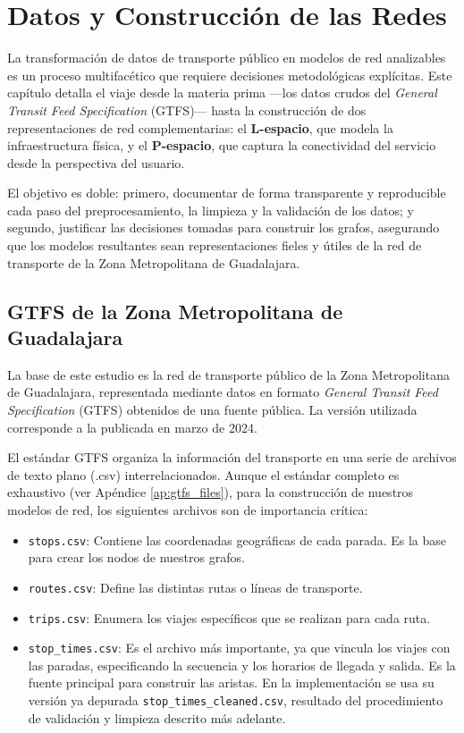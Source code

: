 \chapter{Datos y Construcción de las Redes}

    La transformación de datos de transporte público en modelos de red analizables es un proceso multifacético que requiere decisiones metodológicas explícitas. Este capítulo detalla el viaje desde la materia prima —los datos crudos del \textit{General Transit Feed Specification} (GTFS)— hasta la construcción de dos representaciones de red complementarias: el \textbf{L-espacio}, que modela la infraestructura física, y el \textbf{P-espacio}, que captura la conectividad del servicio desde la perspectiva del usuario.
    
    El objetivo es doble: primero, documentar de forma transparente y reproducible cada paso del preprocesamiento, la limpieza y la validación de los datos; y segundo, justificar las decisiones tomadas para construir los grafos, asegurando que los modelos resultantes sean representaciones fieles y útiles de la red de transporte de la Zona Metropolitana de Guadalajara.
    
    \section{GTFS de la Zona Metropolitana de Guadalajara}
    
        La base de este estudio es la red de transporte público de la Zona Metropolitana de Guadalajara, representada mediante datos en formato \textit{General Transit Feed Specification} (GTFS) obtenidos de una fuente pública. La versión utilizada corresponde a la publicada en marzo de 2024.
        
        El estándar GTFS organiza la información del transporte en una serie de archivos de texto plano (.csv) interrelacionados. Aunque el estándar completo es exhaustivo (ver Apéndice \ref{ap:gtfs_files}), para la construcción de nuestros modelos de red, los siguientes archivos son de importancia crítica:
        \begin{itemize}
            \item \texttt{stops.csv}: Contiene las coordenadas geográficas de cada parada. Es la base para crear los nodos de nuestros grafos.
            \item \texttt{routes.csv}: Define las distintas rutas o líneas de transporte.
            \item \texttt{trips.csv}: Enumera los viajes específicos que se realizan para cada ruta.
            \item \texttt{stop\_times.csv}: Es el archivo más importante, ya que vincula los viajes con las paradas, especificando la secuencia y los horarios de llegada y salida. Es la fuente principal para construir las aristas. En la implementación se usa su versión ya depurada \texttt{stop\_times\_cleaned.csv}, resultado del procedimiento de validación y limpieza descrito más adelante.
        \end{itemize}
        
